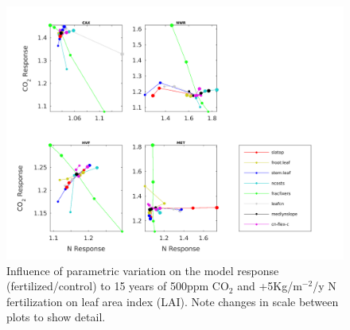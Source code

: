 \documentclass[draft,linenumbers]{agujournal}
\begin{document}
 
  \begin{figure}[h]
     \includegraphics[width=1.35\textwidth]{matlab/figures/MAY19jp_at_relCNdep_defpft_TLAI_y2013.png}
     \caption{Influence of parametric variation on the model response (fertilized/control) to 15 years of 500ppm CO$_{2}$ and +5Kg/m$^{-2}$/y N fertilization on leaf area index (LAI). Note changes in scale between plots to show detail.}
     \label{LAI_CN}
  \end{figure}
\end{document}

